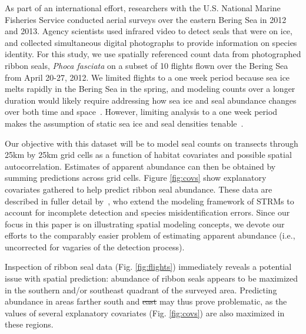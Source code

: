 \documentclass[10pt,letterpaper]{article}
\providecommand{\DIFadd}[1]{{\protect\color{blue}\uwave{#1}}} %
\providecommand{\DIFdel}[1]{{\protect\color{red}\sout{#1}}}                      %
\providecommand{\DIFaddbegin}{} %
\providecommand{\DIFaddend}{} %
\providecommand{\DIFdelbegin}{} %
\providecommand{\DIFdelend}{} %
\begin{document}
As part of an international effort, researchers with the U.S. National Marine Fisheries Service conducted aerial surveys over the eastern Bering Sea in 2012 and 2013.  Agency scientists used infrared video to detect seals that were on ice, and collected simultaneous digital photographs to provide information on species identity. For this study, we use spatially referenced count data from photographed ribbon seals, {\it Phoca fasciata} on a subset of 10 flights flown over the Bering Sea from April 20-27, 2012.  We limited flights to a one week period because sea ice melts rapidly in the Bering Sea in the spring, and modeling counts over a longer duration would likely require addressing how sea ice and seal abundance changes over both time and space~\cite{ConnEtAl2015}. However, limiting analysis to a one week period makes the assumption of static sea ice and seal densities tenable~\cite{ConnEtAl2014}.

Our objective with this dataset will be to model seal counts on transects through 25km by 25km grid cells as a function of habitat covariates and possible spatial autocorrelation.
Estimates of apparent abundance can then be obtained by summing predictions across grid cells. Figure \ref{fig:covs} show explanatory covariates gathered to help predict ribbon seal abundance.  These data are described in fuller detail by~\cite{ConnEtAl2014}, who extend the modeling framework of STRMs to account for incomplete detection and species misidentification errors.  Since our focus in this paper is on illustrating spatial modeling concepts, we devote our efforts to the comparably easier problem of estimating apparent abundance (i.e., uncorrected for vagaries of the detection process).

Inspection of ribbon seal data (Fig. \ref{fig:flights}) immediately reveals a potential
issue with spatial prediction: abundance of ribbon seals appears to be maximized in the southern and/or southeast quadrant of the surveyed area.  Predicting abundance in areas farther south and \DIFdelbegin \DIFdel{east }\DIFdelend \DIFaddbegin \DIFadd{west }\DIFaddend may thus prove problematic, as the values of several explanatory covariates (Fig. \ref{fig:covs}) are also maximized in these regions.
\end{document}
